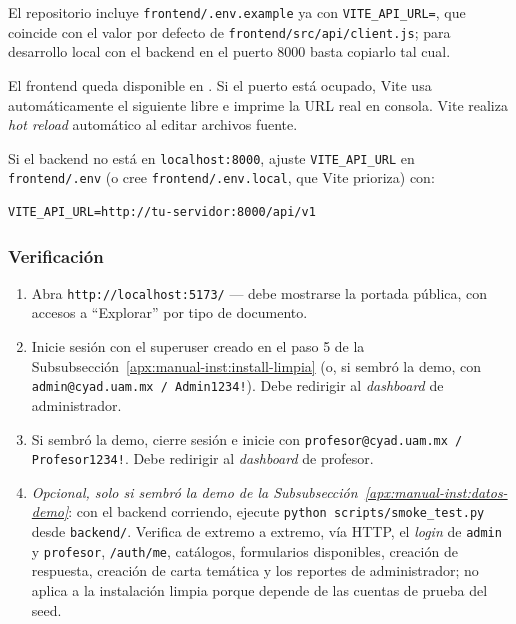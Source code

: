 El repositorio incluye \texttt{frontend/.env.example} ya con \texttt{VITE\_API\_URL=}, que coincide con el valor por defecto de \texttt{frontend/src/api/client.js}; para desarrollo local con el backend en el puerto 8000 basta copiarlo tal cual.

El frontend queda disponible en . Si el puerto está ocupado, Vite usa automáticamente el siguiente libre e imprime la URL real en consola. Vite realiza \emph{hot reload} automático al editar archivos fuente.

Si el backend no está en \texttt{localhost:8000}, ajuste \texttt{VITE\_API\_URL} en \texttt{frontend/.env} (o cree \texttt{frontend/.env.local}, que Vite prioriza) con:

\begin{lstlisting}[language=DotEnv,style=mystyle-sn]
VITE_API_URL=http://tu-servidor:8000/api/v1
\end{lstlisting}

\subsubsection{Verificación}

\begin{enumerate}
    \item Abra \texttt{http://localhost:5173/} — debe mostrarse la portada pública, con accesos a ``Explorar'' por tipo de documento.
    \item Inicie sesión con el superuser creado en el paso 5 de la Subsubsección~\ref{apx:manual-inst:install-limpia} (o, si sembró la demo, con \texttt{admin@cyad.uam.mx / Admin1234!}). Debe redirigir al \emph{dashboard} de administrador.
    \item Si sembró la demo, cierre sesión e inicie con \texttt{profesor@cyad.uam.mx / Profesor1234!}. Debe redirigir al \emph{dashboard} de profesor.
    \item \emph{Opcional, solo si sembró la demo de la Subsubsección~\ref{apx:manual-inst:datos-demo}}: con el backend corriendo, ejecute \texttt{python scripts/smoke\_test.py} desde \texttt{backend/}. Verifica de extremo a extremo, vía HTTP, el \emph{login} de \texttt{admin} y \texttt{profesor}, \texttt{/auth/me}, catálogos, formularios disponibles, creación de respuesta, creación de carta temática y los reportes de administrador; no aplica a la instalación limpia porque depende de las cuentas de prueba del seed.
\end{enumerate}

